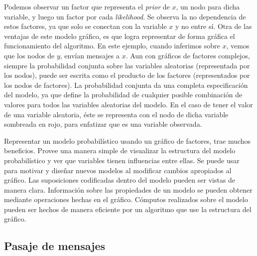 \documentclass[11pt,twoside,spanish]{report} %
\begin{document}
Podemos observar un factor que representa el \textit{prior} de $x$, un nodo para dicha variable, y luego un factor por cada \emph{likelihood}.
Se observa la no dependencia de estos factores, ya que solo se conectan con la variable $x$ y no entre s\'i.
Otra de las ventajas de este modelo gr\'afico, es que logra representar de forma gr\'afica el funcionamiento  del algoritmo.
En este ejemplo, cuando inferimos sobre $x$, vemos que los nodos de $y$, env\'ian mensajes a $x$.
Aun con gr\'aficos de factores complejos, siempre la probabilidad conjunta sobre las variables aleatorias (representada por los nodos), puede ser escrita como el producto de los factores (representados por los nodos de factores).
La probabilidad conjunta da una completa especificaci\'on del modelo, ya que define la probabilidad de cualquier posible combinaci\'on de valores para todos las variables aleatorias del modelo.
En el caso de tener el valor de una variable aleatoria, \'este se representa con el nodo de dicha variable sombreada en rojo, para enfatizar que es una variable observada.

Representar un modelo probabil\'istico usando un gr\'afico de factores, trae muchos beneficios.
Provee una manera simple de visualizar la estructura del modelo probabil\'istico y ver que variables tienen influencias entre ellas.
Se puede usar para motivar y dise\~nar nuevos modelos al modificar cambios apropiados al gr\'afico.
Las suposiciones codificadas dentro del modelo pueden ser vistas de manera clara.
Informaci\'on sobre las propiedades de un modelo se pueden obtener mediante operaciones hechas en el gr\'afico.
C\'omputos realizados sobre el modelo pueden ser hechos de manera eficiente por un algoritmo que use la estructura del gr\'afico.



\subsection{Pasaje de mensajes}\label{Sec:PasajeDeMensajes}
\end{document}
